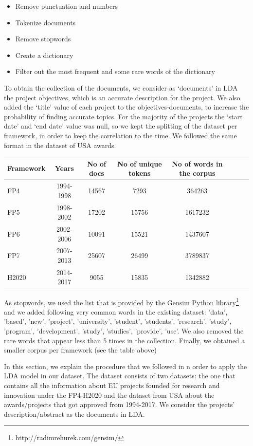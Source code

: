 \documentclass[12pt]{report}
\begin{document}
\begin{itemize}
\item Remove punctuation and numbers
\item Tokenize documents
\item Remove stopwords
\item Create a dictionary
\item Filter out the most frequent and some rare words of the dictionary
\end{itemize}

To obtain the collection of the documents, we consider as ‘documents’ in LDA the project objectives, which is an accurate description for the project. We also added the ‘title’ value of each project to the objectives-documents, to increase the probability of finding accurate topics. For the majority of the projects the ‘start date’ and ‘end date’ value was null, so we kept the splitting of the dataset per framework, in order to keep the correlation to the time. We followed the same format in the dataset of USA awards.

\begin{center}
\begin{tabular}{l*{6}{c}r}
Framework & Years & No of docs & No of unique tokens & No of words in the corpus \\
\hline
FP4 & 1994-1998 & 14567 & 7293 & 364263 \\
FP5 & 1998-2002 & 17202 & 15756 & 1617232 \\
FP6 & 2002-2006 & 10091 & 15521 & 1437607 \\
FP7 & 2007-2013 & 25607 & 26499 & 3789837 \\
H2020 & 2014-2017 & 9055 & 15835 & 1342882 \\
\end{tabular}
\end{center}

As stopwords, we used the list that is provided by the Gensim Python library\footnote{http://radimrehurek.com/gensim/} and we added following very common words in the existing dataset: 'data', 'based', 'new', 'project', 'university', 'student', 'students', 'research', 'study', 'program', 'development', 'study', 'studies', 'provide', 'use'. We also removed the rare words that appear less than 5 times in the collection. Finally, we obtained a smaller corpus per framework (see the table above)

In this section, we explain the procedure that we followed in n order to apply the LDA model in our dataset. The dataset consists of two datasets: the one that contains all the information about EU projects founded for research and innovation under the FP4-H2020 and the dataset from USA about the awards/projects that got approved from 1994-2017. We consider the projects' description/abstract as the documents in LDA.
 
\end{document}
